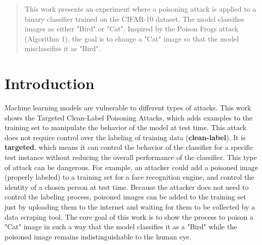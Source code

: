 \begin{abstract}
    This work presents an experiment where a poisoning attack is applied to a binary classifier trained on the CIFAR-10 dataset. 
    The model classifies images as either "Bird" or "Cat". Inspired by the Poison Frogs attack (Algorithm 1), the goal is to change a "Cat" image so that the model misclassifies it as "Bird".
\end{abstract}

\section{Introduction}
Machine learning models are vulnerable to different types of attacks. This work shows the \textsf{Targeted Clean-Label Poisoning Attacks}, which adds examples to the training set to manipulate the behavior of the model at test time.
This attack does not require control over the labeling of training data (\textbf{clean-label}). It is \textbf{targeted}, which means it can control the behavior of the classifier for a specific test instance without reducing the overall performance of the classifier.
This type of attack can be dangerous. For example, an attacker could add a poisoned image (properly labeled) to a training set for a face recognition engine, and control the identity of a chosen person at test time. 
Because the attacker does not need to control the labeling process, poisoned images can be added to the training set just by uploading them to the internet and waiting for them to be collected by a data scraping tool. 
The core goal of this work is to show the process \textsf{to poison} a "Cat" image in such a way that the model classifies it as a "Bird" while the poisoned image remains indistinguishable to the human eye.
